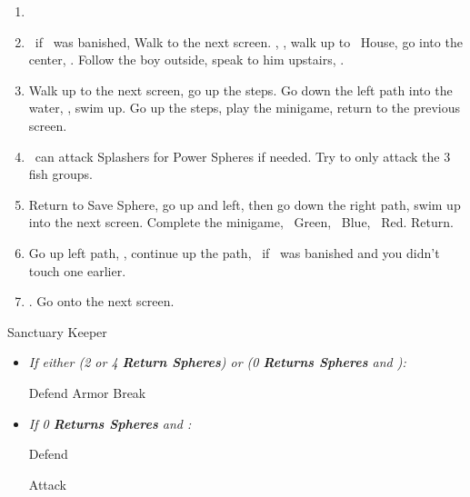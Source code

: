 \begin{enumerate}[resume]
	\item \formation{\tidus}{\kimahri}{\auron}
	\item \save\ if \bahamut\ was banished, Walk to the next screen. \skippablefmv[0:20], \sd, walk up to \tidus\ House, go into the center, \sd. Follow the boy outside, speak to him upstairs, \sd.
	\item Walk up to the next screen, go up the steps. Go down the left path into the water, \sd, swim up. Go up the steps, play the minigame, return to the previous screen.
	\item \tidus\ can attack Splashers for Power Spheres if needed. Try to only attack the 3 fish groups.
	\item Return to Save Sphere, go up and left, then go down the right path, swim up into the next screen. Complete the minigame, \rikku\ Green, \tidus\ Blue, \wakka\ Red. Return.
	\item Go up left path, \sd, continue up the path, \save\ if \bahamut\ was banished and you didn't touch one earlier.
	\item \formation{\tidus}{\yuna}{\kimahri}. Go onto the next screen.
\end{enumerate}
\bothvfill
\winvfill
\lossvfill
\begin{battle}[40000]{Sanctuary Keeper}
	\begin{itemize}
		\item \textit{If either (2 or 4 \textbf{Return Spheres}) or (0 \textbf{Returns Spheres} and \blitzloss):}
		      \begin{itemize}
			      \yunaf Defend
			      \tidusf Armor Break
		      \end{itemize}
		\item \textit{If 0 \textbf{Returns Spheres} and \blitzwin:}
		      \begin{itemize}
			      \tidusf Defend
		      \end{itemize}
		      \summon{\bahamut}
		      \bahamutf Attack
	\end{itemize}
\end{battle}